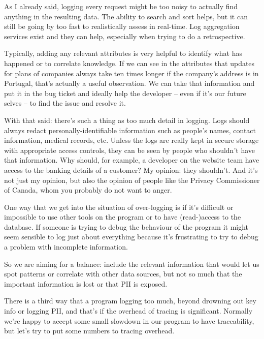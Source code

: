 As I already said, logging every request might be too noisy to actually find anything in the resulting data. The ability to search and sort helps, but it can still be going by too fast to realistically assess in real-time. Log aggregation services exist and they can help, especially when trying to do a retrospective.

Typically, adding any relevant attributes is very helpful to identify what has happened or to correlate knowledge. If we can see in the attributes that updates for plans of companies always take ten times longer if the company's address is in Portugal, that's actually a useful observation. We can take that information and put it in the bug ticket and ideally help the developer -- even if it's our future selves -- to find the issue and resolve it.

With that said: there's such a thing as too much detail in logging. Logs should always redact personally-identifiable information such as people's names, contact information, medical records, etc. Unless the logs are really kept in secure storage with appropriate access controls, they can be seen by people who shouldn't have that information. Why should, for example, a developer on the website team have access to the banking details of a customer? My opinion: they shouldn't. And it's not just my opinion, but also the opinion of people like the Privacy Commissioner of Canada, whom you probably do not want to anger.

One way that we get into the situation of over-logging is if it's difficult or impossible to use other tools on the program or to have (read-)access to the database. If someone is trying to debug the behaviour of the program it might seem sensible to log just about everything because it's frustrating to try to debug a problem with incomplete information. 

So we are aiming for a balance: include the relevant information that would let us spot patterns or correlate with other data sources, but not so much that the important information is lost or that PII is exposed.

There is a third way that a program logging too much, beyond drowning out key info or logging PII, and that's if the overhead of tracing is significant. Normally we're happy to accept some small slowdown in our program to have traceability, but let's try to put some numbers to tracing overhead. 

